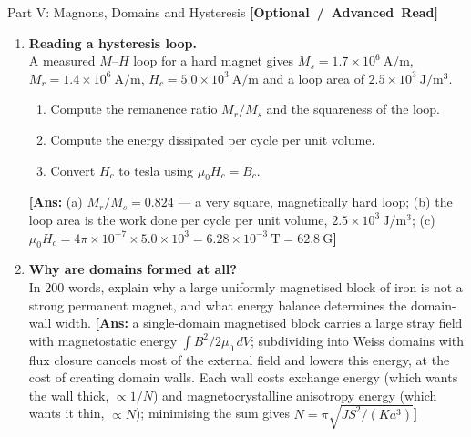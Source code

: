 \documentclass[11pt,a4paper]{article}
\newcommand{\extratag}{\hfill\mbox{\normalfont\footnotesize\sffamily\color{secondary}\textbf{[Optional / Advanced Read]}}}
\begin{document}
\begin{assignmentbox}{Part V: Magnons, Domains and Hysteresis \extratag}
\begin{enumerate}[label=\textbf{V.\arabic*.}, leftmargin=*]
    \item \textbf{Reading a hysteresis loop.}\\
    A measured $M$--$H$ loop for a hard magnet gives $M_s = 1.7\times10^{6}\ \mathrm{A/m}$, $M_r = 1.4\times10^{6}\ \mathrm{A/m}$, $H_c = 5.0\times10^{3}\ \mathrm{A/m}$ and a loop area of $2.5\times10^{3}\ \mathrm{J/m^3}$.
    \begin{enumerate}[label=(\alph*)]
        \item Compute the remanence ratio $M_r/M_s$ and the squareness of the loop.
        \item Compute the energy dissipated per cycle per unit volume.
        \item Convert $H_c$ to tesla using $\mu_0H_c = B_c$.
    \end{enumerate}
    \textbf{[Ans:} (a) $M_r/M_s = 0.824$ --- a very square, magnetically hard loop; (b) the loop area is the work done per cycle per unit volume, $2.5\times10^{3}\ \mathrm{J/m^3}$; (c) $\mu_0H_c = 4\pi\times10^{-7}\times5.0\times10^{3} = 6.28\times10^{-3}\ \mathrm{T} = 62.8\ \mathrm{G}$\textbf{]}

    \item \textbf{Why are domains formed at all?}\\
    In 200 words, explain why a large uniformly magnetised block of iron is not a strong permanent magnet, and what energy balance determines the domain-wall width.
    \textbf{[Ans:} a single-domain magnetised block carries a large stray field with magnetostatic energy $\int B^2/2\mu_0\,dV$; subdividing into Weiss domains with flux closure cancels most of the external field and lowers this energy, at the cost of creating domain walls. Each wall costs exchange energy (which wants the wall thick, $\propto 1/N$) and magnetocrystalline anisotropy energy (which wants it thin, $\propto N$); minimising the sum gives $N = \pi\sqrt{JS^2/(Ka^3)}$\textbf{]}

\end{enumerate}
\end{assignmentbox}
\end{document}
